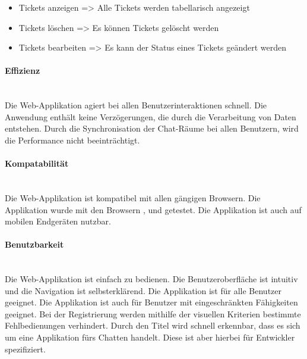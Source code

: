 \begin{itemize}
\begin{itemize}
      \begin{itemize}
        \item Tickets anzeigen
        \newline
        => Alle Tickets werden tabellarisch angezeigt
        \item Tickets löschen
        \newline
        => Es können Tickets gelöscht werden
        \item Tickets bearbeiten
        \newline
        => Es kann der Status eines Tickets geändert werden
      \end{itemize}  
    \end{itemize}   
\end{itemize}

\paragraph{Effizienz}\mbox{} \\
\noindent
Die Web-Applikation agiert bei allen Benutzerinteraktionen schnell. Die Anwendung enthält keine Verzögerungen, die durch die Verarbeitung von Daten entstehen. Durch die Synchronisation der Chat-Räume bei allen Benutzern, wird die Performance nicht beeinträchtigt.

\paragraph{Kompatabilität}\mbox{} \\
\noindent
Die Web-Applikation ist kompatibel mit allen gängigen Browsern. Die Applikation wurde mit den Browsern ,  und  getestet. Die Applikation ist auch auf mobilen Endgeräten nutzbar.

\paragraph{Benutzbarkeit}\mbox{} \\
\noindent
Die Web-Applikation ist einfach zu bedienen. Die Benutzeroberfläche ist intuitiv und die Navigation ist selbsterklärend. Die Applikation ist für alle Benutzer geeignet. Die Applikation ist auch für Benutzer mit eingeschränkten Fähigkeiten geeignet. Bei der Registrierung werden mithilfe der visuellen Kriterien bestimmte Fehlbedienungen verhindert. Durch den Titel  wird schnell erkennbar, dass es sich um eine Applikation fürs Chatten handelt. Diese ist aber hierbei für Entwickler spezifiziert.

